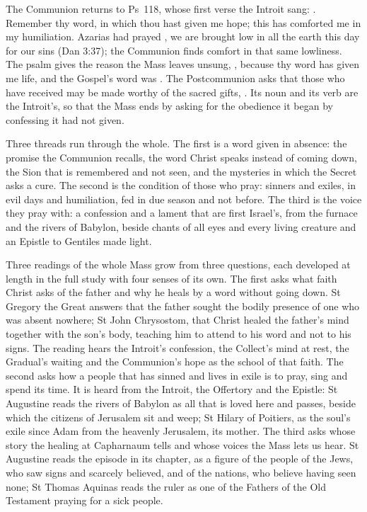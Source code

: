The Communion returns to Ps~118, whose first verse the Introit sang:
. Remember thy word, in which thou hast given
me hope; this has comforted me in my humiliation. Azarias had prayed
, we are
brought low in all the earth this day for our sins (Dan 3:37); the Communion
finds comfort in that same lowliness. The psalm gives the reason the Mass leaves
unsung, , because thy word has given
me life, and the Gospel's word was . The Postcommunion
asks that those who have received may be made worthy of the sacred gifts,
. Its noun and its verb are
the Introit's, so that the Mass ends by asking for the obedience it began by
confessing it had not given.

Three threads run through the whole. The first is a word given in absence: the
promise the Communion recalls, the word Christ speaks instead of coming down,
the Sion that is remembered and not seen, and the mysteries in which the Secret
asks a cure. The second is the condition of those who pray: sinners and
exiles, in evil days and humiliation, fed in due season and not before. The
third is the voice they pray with: a confession and a lament that are first
Israel's, from the furnace and the rivers of Babylon, beside chants of all eyes
and every living creature and an Epistle to Gentiles made light.

Three readings of the whole Mass grow from three questions, each developed at
length in the full study with four senses of its own. The first asks what faith
Christ asks of the father and why he heals by a word without going down. St
Gregory the Great answers that the father sought the bodily presence of one who
was absent nowhere; St John Chrysostom, that Christ healed the father's mind
together with the son's body, teaching him to attend to his word and not to his
signs. The reading hears the Introit's confession, the Collect's mind at rest,
the Gradual's waiting and the Communion's hope as the school of that faith. The
second asks how a people that has sinned and lives in exile is to pray, sing
and spend its time. It is heard from the Introit, the Offertory and the
Epistle: St Augustine reads the rivers of Babylon as all that is loved here and
passes, beside which the citizens of Jerusalem sit and weep; St Hilary of
Poitiers, as the soul's exile since Adam from the heavenly Jerusalem, its
mother. The third asks whose story the healing at Capharnaum tells and whose
voices the Mass lets us hear. St Augustine reads the episode in its chapter, as
a figure of the people of the Jews, who saw signs and scarcely believed, and of
the nations, who believe having seen none; St Thomas Aquinas reads the ruler as
one of the Fathers of the Old Testament praying for a sick people.

